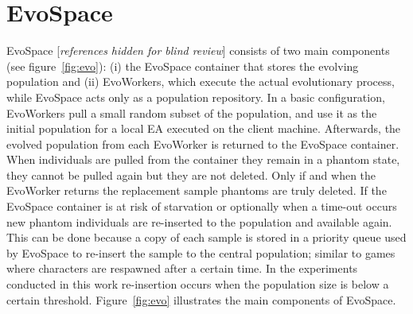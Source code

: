 \documentclass{llncs}
\begin{document}
 
\section{EvoSpace}
\label{sec:evo}

EvoSpace [{\em references hidden for blind review}] consists of two main components (see figure~\ref{fig:evo}): (i) the EvoSpace 
container that stores the evolving population and (ii) EvoWorkers, which execute 
the actual evolutionary process, while EvoSpace acts only as a population repository.
In a basic configuration, EvoWorkers pull a small random subset of the 
population, and use it as the initial population for a local EA executed 
on the client machine. Afterwards, the evolved population from each EvoWorker 
is returned to the EvoSpace container. When individuals are pulled from the 
container they remain in a phantom state, they cannot be pulled again but 
they are not deleted. Only if and when the EvoWorker returns the replacement 
sample phantoms are truly deleted. If the EvoSpace container is at risk of 
starvation or optionally when a time-out occurs new phantom individuals are 
re-inserted to the population and available again. This can be done because a 
copy of each sample is stored in a priority queue used by EvoSpace to re-insert 
the sample to the central population; similar to games where characters are 
respawned after a certain time. In the experiments conducted in this work 
re-insertion occurs when the population size is below a certain threshold. 
Figure~\ref{fig:evo} illustrates the main components of EvoSpace.
\end{document}
